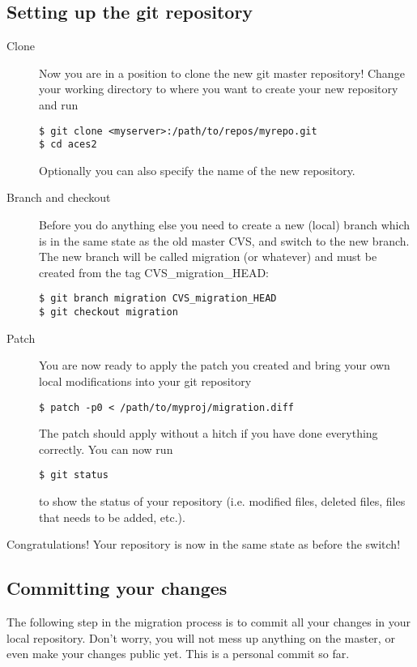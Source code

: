 \documentclass[a4paper,10pt]{article}
\begin{document}
\subsection{Setting up the git repository}
\begin{description}
\item[Clone] Now you are in a position to clone the new git master repository!
Change your working directory to where you want to create your new repository
and run
\begin{verbatim}
$ git clone <myserver>:/path/to/repos/myrepo.git
$ cd aces2 
\end{verbatim}
Optionally you can also specify the name of the new repository.
\item[Branch and checkout] 
Before you do anything else you need to create a new (local) branch which is
in the same state as the old master CVS, and switch to the new branch. The new
branch will be called migration (or whatever) and must be created from the tag
CVS\_migration\_HEAD:
\begin{verbatim}
$ git branch migration CVS_migration_HEAD
$ git checkout migration
\end{verbatim}
\item[Patch] You are now ready to apply the patch you created and bring your
own local modifications into your git repository
\begin{verbatim}
$ patch -p0 < /path/to/myproj/migration.diff
\end{verbatim}
The patch should apply without a hitch if you have done everything correctly.
You can now run 
\begin{verbatim}
$ git status
\end{verbatim}
to show the status of your repository (i.e. modified files, deleted files,
files that needs to be added, etc.).
\end{description}

Congratulations! Your repository is now in the same state as before the 
switch!

\subsection{Committing your changes}
The following step in the migration process is to commit all
your changes in your local repository. Don't worry, you will not mess up
anything on the master, or even make your changes public yet. This is a
personal commit so far. 
\end{document}
